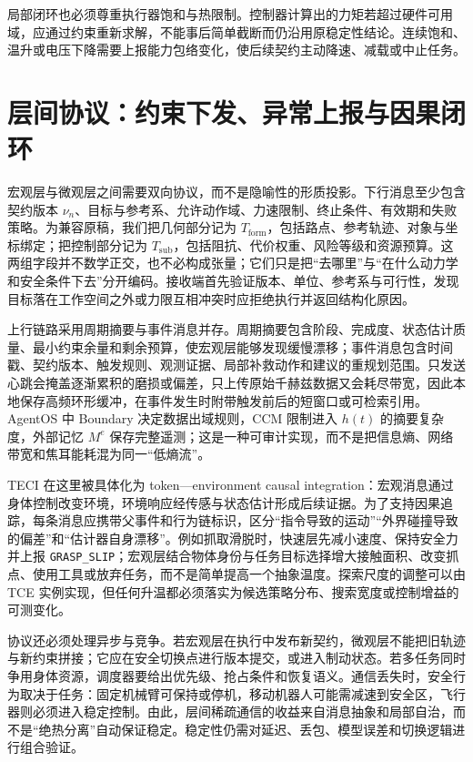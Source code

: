 局部闭环也必须尊重执行器饱和与热限制。控制器计算出的力矩若超过硬件可用域，应通过约束重新求解，不能事后简单截断而仍沿用原稳定性结论。连续饱和、温升或电压下降需要上报能力包络变化，使后续契约主动降速、减载或中止任务。

\section{层间协议：约束下发、异常上报与因果闭环}
\label{sec:interaction_protocols}

宏观层与微观层之间需要双向协议，而不是隐喻性的形质投影。下行消息至少包含契约版本 $\nu_n$、目标与参考系、允许动作域、力速限制、终止条件、有效期和失败策略。为兼容原稿，我们把几何部分记为 $T_{\mathrm{form}}$，包括路点、参考轨迹、对象与坐标绑定；把控制部分记为 $T_{\mathrm{sub}}$，包括阻抗、代价权重、风险等级和资源预算。这两组字段并不数学正交，也不必构成张量；它们只是把“去哪里”与“在什么动力学和安全条件下去”分开编码。接收端首先验证版本、单位、参考系与可行性，发现目标落在工作空间之外或力限互相冲突时应拒绝执行并返回结构化原因。

上行链路采用周期摘要与事件消息并存。周期摘要包含阶段、完成度、状态估计质量、最小约束余量和剩余预算，使宏观层能够发现缓慢漂移；事件消息包含时间戳、契约版本、触发规则、观测证据、局部补救动作和建议的重规划范围。只发送心跳会掩盖逐渐累积的磨损或偏差，只上传原始千赫兹数据又会耗尽带宽，因此本地保存高频环形缓冲，在事件发生时附带触发前后的短窗口或可检索引用。AgentOS 中 Boundary 决定数据出域规则，CCM 限制进入 $h(t)$ 的摘要复杂度，外部记忆 $M^e$ 保存完整遥测；这是一种可审计实现，而不是把信息熵、网络带宽和焦耳能耗混为同一“低熵流”。

TECI 在这里被具体化为 token—environment causal integration：宏观消息通过身体控制改变环境，环境响应经传感与状态估计形成后续证据。为了支持因果追踪，每条消息应携带父事件和行为链标识，区分“指令导致的运动”“外界碰撞导致的偏差”和“估计器自身漂移”。例如抓取滑脱时，快速层先减小速度、保持安全力并上报 \texttt{GRASP\_SLIP}；宏观层结合物体身份与任务目标选择增大接触面积、改变抓点、使用工具或放弃任务，而不是简单提高一个抽象温度。探索尺度的调整可以由 TCE 实例实现，但任何升温都必须落实为候选策略分布、搜索宽度或控制增益的可测变化。

协议还必须处理异步与竞争。若宏观层在执行中发布新契约，微观层不能把旧轨迹与新约束拼接；它应在安全切换点进行版本提交，或进入制动状态。若多任务同时争用身体资源，调度器要给出优先级、抢占条件和恢复语义。通信丢失时，安全行为取决于任务：固定机械臂可保持或停机，移动机器人可能需减速到安全区，飞行器则必须进入稳定控制。由此，层间稀疏通信的收益来自消息抽象和局部自治，而不是“绝热分离”自动保证稳定。稳定性仍需对延迟、丢包、模型误差和切换逻辑进行组合验证。


